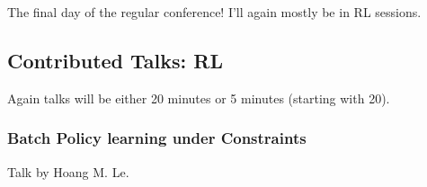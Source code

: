 The final day of the regular conference! I'll again mostly be in RL sessions.

\subsection{Contributed Talks: RL}

Again talks will be either 20 minutes or 5 minutes (starting with 20).


\subsubsection{Batch Policy learning under Constraints}

Talk by Hoang M. Le. \\

